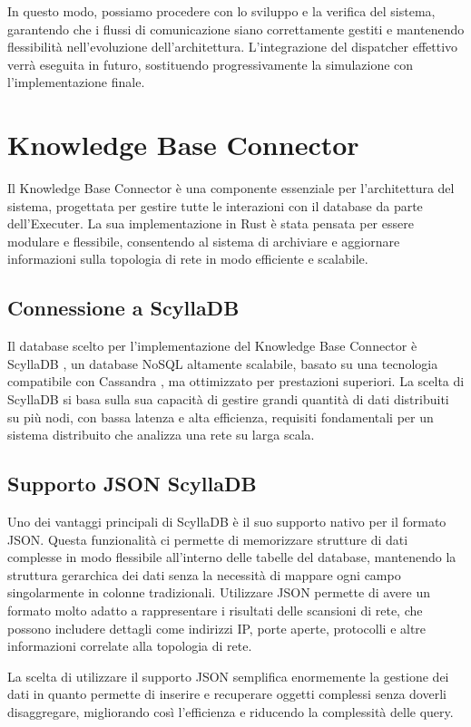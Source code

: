 \documentclass[target=bach,aauheader=,style=]{thud}
\begin{document}
In questo modo, possiamo procedere con lo sviluppo e la verifica del sistema, garantendo che i flussi di comunicazione siano correttamente gestiti e mantenendo flessibilità nell'evoluzione dell'architettura. L'integrazione del dispatcher effettivo verrà eseguita in futuro, sostituendo progressivamente la simulazione con l'implementazione finale.

\section{Knowledge Base Connector}
Il Knowledge Base Connector è una componente essenziale per l'architettura del sistema, progettata per gestire tutte le interazioni con il database da parte dell'Executer. La sua implementazione in Rust è stata pensata per essere modulare e flessibile, consentendo al sistema di archiviare e aggiornare informazioni sulla topologia di rete in modo efficiente e scalabile.

\subsection{Connessione a ScyllaDB}
Il database scelto per l’implementazione del Knowledge Base Connector è ScyllaDB \cite{scylladb2024}, un database NoSQL altamente scalabile, basato su una tecnologia compatibile con Cassandra \cite{cassandra2024}, ma ottimizzato per prestazioni superiori. La scelta di ScyllaDB si basa sulla sua capacità di gestire grandi quantità di dati distribuiti su più nodi, con bassa latenza e alta efficienza, requisiti fondamentali per un sistema distribuito che analizza una rete su larga scala.

\subsection{Supporto JSON ScyllaDB}
Uno dei vantaggi principali di ScyllaDB è il suo supporto nativo per il formato JSON. Questa funzionalità ci permette di memorizzare strutture di dati complesse in modo flessibile all'interno delle tabelle del database, mantenendo la struttura gerarchica dei dati senza la necessità di mappare ogni campo singolarmente in colonne tradizionali. Utilizzare JSON permette di avere un formato molto adatto a rappresentare i risultati delle scansioni di rete, che possono includere dettagli come indirizzi IP, porte aperte, protocolli e altre informazioni correlate alla topologia di rete.

La scelta di utilizzare il supporto JSON semplifica enormemente la gestione dei dati in quanto permette di inserire e recuperare oggetti complessi senza doverli disaggregare, migliorando così l'efficienza e riducendo la complessità delle query.
\end{document}
